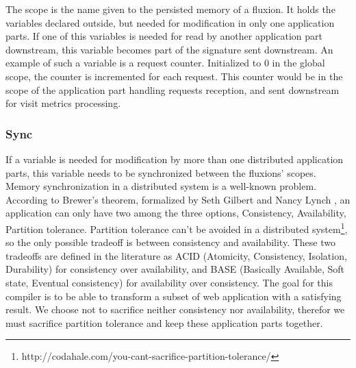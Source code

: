 The scope is the name given to the persisted memory of a fluxion.
It holds the variables declared outside, but needed for modification in only one application parts.
If one of this variables is needed for read by another application part downstream, this variable becomes part of the signature sent downstream.
An example of such a variable is a request counter. Initialized to 0 in the global scope, the counter is incremented for each request.
This counter would be in the scope of the application part handling requests reception, and sent downstream for visit metrics processing.

\subsubsection{Sync}

If a variable is needed for modification by more than one distributed application parts, this variable needs to be synchronized between the fluxions' scopes.
Memory synchronization in a distributed system is a well-known problem.
According to Brewer's theorem, formalized by Seth Gilbert and Nancy Lynch \cite{Gilbert2002}, an application can only have two among the three options, Consistency, Availability, Partition tolerance.
Partition tolerance can't be avoided in a distributed system\footnote{\raggedright http://codahale.com/you-cant-sacrifice-partition-tolerance/}, so the only possible tradeoff is between consistency and availability.
These two tradeoffs are defined in the literature as ACID (Atomicity, Consistency, Isolation, Durability) for consistency over availability, and BASE (Basically Available, Soft state, Eventual consistency)\cite{Fox1997} for availability over consistency.
The goal for this compiler is to be able to transform a subset of web application with a satisfying result.
We choose not to sacrifice neither consistency nor availability, therefor we must sacrifice partition tolerance and keep these application parts together.

